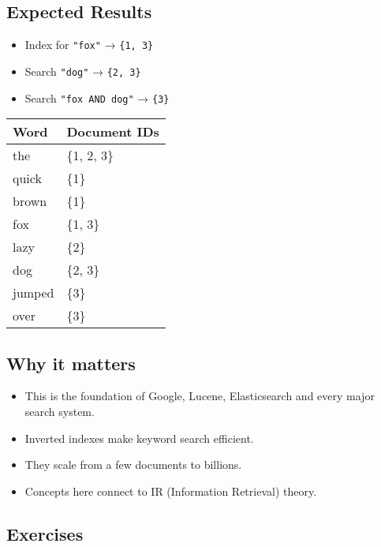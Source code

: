\documentclass[
  letterpaper,
  DIV=11,
  numbers=noendperiod]{scrreprt}
\providecommand{\tightlist}{%
  \setlength{\itemsep}{0pt}\setlength{\parskip}{0pt}}
\begin{document}
\subsection{Expected Results}\label{expected-results-12}

\begin{itemize}
\tightlist
\item
  Index for \texttt{"fox"} → \texttt{\{1,\ 3\}}
\item
  Search \texttt{"dog"} → \texttt{\{2,\ 3\}}
\item
  Search \texttt{"fox\ AND\ dog"} → \texttt{\{3\}}
\end{itemize}

\begin{longtable}[]{@{}ll@{}}
\toprule\noalign{}
Word & Document IDs \\
\midrule\noalign{}
\endhead
\bottomrule\noalign{}
\endlastfoot
the & \{1, 2, 3\} \\
quick & \{1\} \\
brown & \{1\} \\
fox & \{1, 3\} \\
lazy & \{2\} \\
dog & \{2, 3\} \\
jumped & \{3\} \\
over & \{3\} \\
\end{longtable}

\subsection{Why it matters}\label{why-it-matters-57}

\begin{itemize}
\tightlist
\item
  This is the foundation of Google, Lucene, Elasticsearch and every
  major search system.
\item
  Inverted indexes make keyword search efficient.
\item
  They scale from a few documents to billions.
\item
  Concepts here connect to IR (Information Retrieval) theory.
\end{itemize}

\subsection{Exercises}\label{exercises-56}
\end{document}
